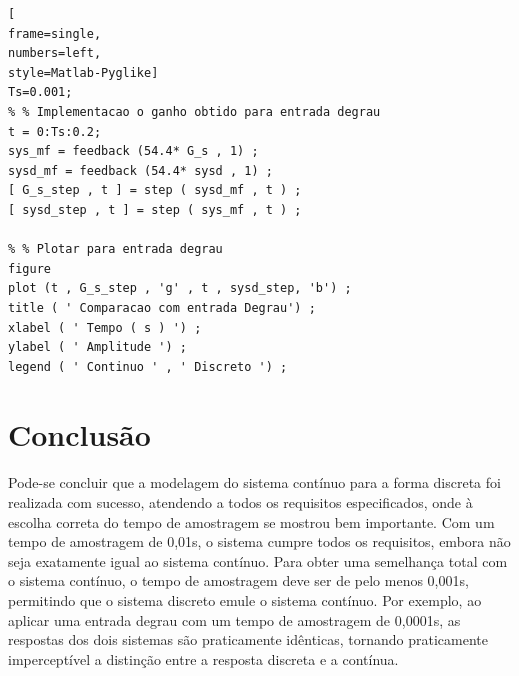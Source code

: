 \documentclass[a4paper, 12pt]{article}
\begin{document}
    
\begin{lstlisting}[
frame=single,
numbers=left,
style=Matlab-Pyglike]
Ts=0.001;
% % Implementacao o ganho obtido para entrada degrau
t = 0:Ts:0.2;
sys_mf = feedback (54.4* G_s , 1) ;
sysd_mf = feedback (54.4* sysd , 1) ;
[ G_s_step , t ] = step ( sysd_mf , t ) ;
[ sysd_step , t ] = step ( sys_mf , t ) ;

% % Plotar para entrada degrau
figure
plot (t , G_s_step , 'g' , t , sysd_step, 'b') ;
title ( ' Comparacao com entrada Degrau') ;
xlabel ( ' Tempo ( s ) ') ;
ylabel ( ' Amplitude ') ;
legend ( ' Continuo ' , ' Discreto ') ;
\end{lstlisting}
\newpage


\section{Conclusão} 
Pode-se concluir que a modelagem do sistema contínuo para a forma discreta foi realizada com sucesso, atendendo a todos os requisitos especificados, onde à escolha correta do tempo de amostragem se mostrou bem importante. Com um tempo de amostragem de 0,01s, o sistema cumpre todos os requisitos, embora não seja exatamente igual ao sistema contínuo. Para obter uma semelhança total com o sistema contínuo, o tempo de amostragem deve ser de pelo menos 0,001s, permitindo que o sistema discreto emule o sistema contínuo. Por exemplo, ao aplicar uma entrada degrau com um tempo de amostragem de 0,0001s, as respostas dos dois sistemas são praticamente idênticas, tornando praticamente imperceptível a distinção entre a resposta discreta e a contínua.
\end{document}
